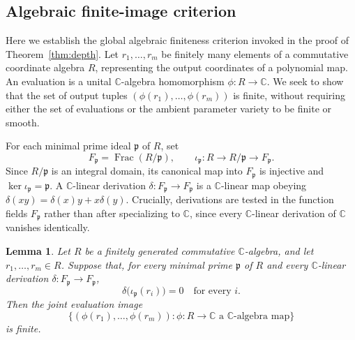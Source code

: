 \documentclass[aps,prl,reprint,notitlepage,nofootinbib,nobibnotes]{revtex4-2}
\newtheorem{lemma}{Lemma}
\begin{document}
\subsection*{Algebraic finite-image criterion}

Here we establish the global algebraic finiteness criterion invoked in the proof of Theorem~\ref{thm:depth}. Let \(r_1,\ldots,r_m\) be finitely many elements of a commutative coordinate algebra \(R\), representing the output coordinates of a polynomial map. An evaluation is a unital \(\mathbb C\)-algebra homomorphism \(\phi:R\to\mathbb C\). We seek to show that the set of output tuples \((\phi(r_1),\ldots,\phi(r_m))\) is finite, without requiring either the set of evaluations or the ambient parameter variety to be finite or smooth.

For each minimal prime ideal \(\mathfrak p\) of \(R\), set
\[
 F_{\mathfrak p}=\operatorname{Frac}(R/\mathfrak p),\qquad
 \iota_{\mathfrak p}:R\longrightarrow R/\mathfrak p
                         \longrightarrow F_{\mathfrak p}.
\]
Since \(R/\mathfrak p\) is an integral domain, its canonical map into \(F_{\mathfrak p}\) is injective and \(\ker\iota_{\mathfrak p}=\mathfrak p\). A \(\mathbb C\)-linear derivation \(\delta:F_{\mathfrak p}\to F_{\mathfrak p}\) is a \(\mathbb C\)-linear map obeying \(\delta(xy)=\delta(x)y+x\delta(y)\). Crucially, derivations are tested in the function fields \(F_{\mathfrak p}\) rather than after specializing to \(\mathbb C\), since every \(\mathbb C\)-linear derivation of \(\mathbb C\) vanishes identically.

\begin{lemma}\label{lem:algebraic-finite-image}
Let \(R\) be a finitely generated commutative \(\mathbb C\)-algebra, and let \(r_1,\ldots,r_m\in R\). Suppose that, for every minimal prime \(\mathfrak p\) of \(R\) and every \(\mathbb C\)-linear derivation \(\delta:F_{\mathfrak p}\to F_{\mathfrak p}\),
\[
 \delta\bigl(\iota_{\mathfrak p}(r_i)\bigr)=0
 \quad\text{for every }i.
\]
Then the joint evaluation image
\[
 \{(\phi(r_1),\ldots,\phi(r_m)):
          \phi:R\to\mathbb C\text{ a }\mathbb C\text{-algebra map}\}
\]
is finite.
\end{lemma}
\end{document}
